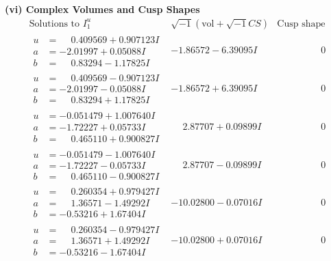 \documentclass[1p]{elsarticle_modified}
\theoremstyle{definition}
\newcommand{\I}{\sqrt{-1}}
\begin{document}
\newpage\flushleft \textbf{(vi) Complex Volumes and Cusp Shapes}
$$\begin{array}{c|c|c}  
\text{Solutions to }I^u_{1}& \I (\text{vol} + \sqrt{-1}CS) & \text{Cusp shape}\\
 \hline 
\begin{aligned}
u &= \phantom{-}0.409569 + 0.907123 I \\
a &= -2.01997 + 0.05088 I \\
b &= \phantom{-}0.83294 - 1.17825 I\end{aligned}
 & -1.86572 - 6.39095 I & \phantom{-0.000000 } 0 \\ \hline\begin{aligned}
u &= \phantom{-}0.409569 - 0.907123 I \\
a &= -2.01997 - 0.05088 I \\
b &= \phantom{-}0.83294 + 1.17825 I\end{aligned}
 & -1.86572 + 6.39095 I & \phantom{-0.000000 } 0 \\ \hline\begin{aligned}
u &= -0.051479 + 1.007640 I \\
a &= -1.72227 + 0.05733 I \\
b &= \phantom{-}0.465110 + 0.900827 I\end{aligned}
 & \phantom{-}2.87707 + 0.09899 I & \phantom{-0.000000 } 0 \\ \hline\begin{aligned}
u &= -0.051479 - 1.007640 I \\
a &= -1.72227 - 0.05733 I \\
b &= \phantom{-}0.465110 - 0.900827 I\end{aligned}
 & \phantom{-}2.87707 - 0.09899 I & \phantom{-0.000000 } 0 \\ \hline\begin{aligned}
u &= \phantom{-}0.260354 + 0.979427 I \\
a &= \phantom{-}1.36571 - 1.49292 I \\
b &= -0.53216 + 1.67404 I\end{aligned}
 & -10.02800 - 0.07016 I & \phantom{-0.000000 } 0 \\ \hline\begin{aligned}
u &= \phantom{-}0.260354 - 0.979427 I \\
a &= \phantom{-}1.36571 + 1.49292 I \\
b &= -0.53216 - 1.67404 I\end{aligned}
 & -10.02800 + 0.07016 I & \phantom{-0.000000 } 0 \\ \hline\begin{aligned}

\end{aligned}
\end{array}$$
\end{document}
